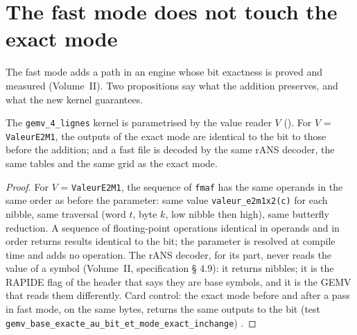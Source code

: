\begin{figure}[tbp]
\centering
\GrapheLatentsNuage
{}
\label{fig:t3-lat-nuage}
\end{figure}

\section{The fast mode does not touch the exact mode}\label{t3sno:sec:propositions}

The fast mode adds a path in an engine whose bit exactness is proved and measured (Volume~II). Two propositions say what the addition preserves, and what the new kernel guarantees.

\begin{proposition}\label{t3sno:prop:b1}
The \texttt{gemv\_4\_lignes} kernel is parametrised by the value reader $V$ (). For $V$ = \texttt{ValeurE2M1}, the outputs of the exact mode are identical to the bit to those before the addition; and a fast file is decoded by the same rANS decoder, the same tables and the same grid as the exact mode.
\end{proposition}
\begin{proof}
For $V$ = \texttt{ValeurE2M1}, the sequence of \texttt{fmaf} has the same operands in the same order as before the parameter: same value \texttt{valeur\_e2m1x2(c)} for each nibble, same traversal (word $t$, byte $k$, low nibble then high), same butterfly reduction. A sequence of floating-point operations identical in operands and in order returns results identical to the bit; the parameter is resolved at compile time and adds no operation. The rANS decoder, for its part, never reads the value of a symbol (Volume~II, specification § 4.9): it returns nibbles; it is the RAPIDE flag of the header that says they are base symbols, and it is the GEMV that reads them differently. Card control: the exact mode before and after a pass in fast mode, on the same bytes, returns the same outputs to the bit (test \texttt{gemv\_base\_exacte\_au\_bit\_et\_mode\_exact\_inchange}) \mes.
\end{proof}


